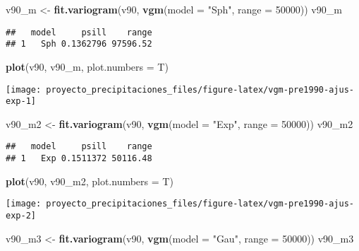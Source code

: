 \documentclass[11pt,]{article}
\newenvironment{Shaded}{\begin{snugshade}}{\end{snugshade}}
\newcommand{\KeywordTok}[1]{\textcolor[rgb]{0.13,0.29,0.53}{\textbf{#1}}}
\newcommand{\DataTypeTok}[1]{\textcolor[rgb]{0.13,0.29,0.53}{#1}}
\newcommand{\DecValTok}[1]{\textcolor[rgb]{0.00,0.00,0.81}{#1}}
\newcommand{\StringTok}[1]{\textcolor[rgb]{0.31,0.60,0.02}{#1}}
\newcommand{\NormalTok}[1]{#1}
\begin{document}
\begin{Shaded}
\begin{Highlighting}[]
\NormalTok{v90_m <-}\StringTok{ }\KeywordTok{fit.variogram}\NormalTok{(v90, }\KeywordTok{vgm}\NormalTok{(}\DataTypeTok{model =} \StringTok{"Sph"}\NormalTok{, }\DataTypeTok{range =} \DecValTok{50000}\NormalTok{))}
\NormalTok{v90_m}
\end{Highlighting}
\end{Shaded}

\begin{verbatim}
##   model     psill    range
## 1   Sph 0.1362796 97596.52
\end{verbatim}

\begin{Shaded}
\begin{Highlighting}[]
\KeywordTok{plot}\NormalTok{(v90, v90_m, }\DataTypeTok{plot.numbers =}\NormalTok{ T)}
\end{Highlighting}
\end{Shaded}

\texttt{[image: proyecto\_precipitaciones\_files/figure-latex/vgm-pre1990-ajus-exp-1]}

\begin{Shaded}
\begin{Highlighting}[]
\NormalTok{v90_m2 <-}\StringTok{ }\KeywordTok{fit.variogram}\NormalTok{(v90, }\KeywordTok{vgm}\NormalTok{(}\DataTypeTok{model =} \StringTok{"Exp"}\NormalTok{, }\DataTypeTok{range =} \DecValTok{50000}\NormalTok{))}
\NormalTok{v90_m2}
\end{Highlighting}
\end{Shaded}

\begin{verbatim}
##   model     psill    range
## 1   Exp 0.1511372 50116.48
\end{verbatim}

\begin{Shaded}
\begin{Highlighting}[]
\KeywordTok{plot}\NormalTok{(v90, v90_m2, }\DataTypeTok{plot.numbers =}\NormalTok{ T)}
\end{Highlighting}
\end{Shaded}

\texttt{[image: proyecto\_precipitaciones\_files/figure-latex/vgm-pre1990-ajus-exp-2]}

\begin{Shaded}
\begin{Highlighting}[]
\NormalTok{v90_m3 <-}\StringTok{ }\KeywordTok{fit.variogram}\NormalTok{(v90, }\KeywordTok{vgm}\NormalTok{(}\DataTypeTok{model =} \StringTok{"Gau"}\NormalTok{, }\DataTypeTok{range =} \DecValTok{50000}\NormalTok{))}
\NormalTok{v90_m3}
\end{Highlighting}
\end{Shaded}
\end{document}
